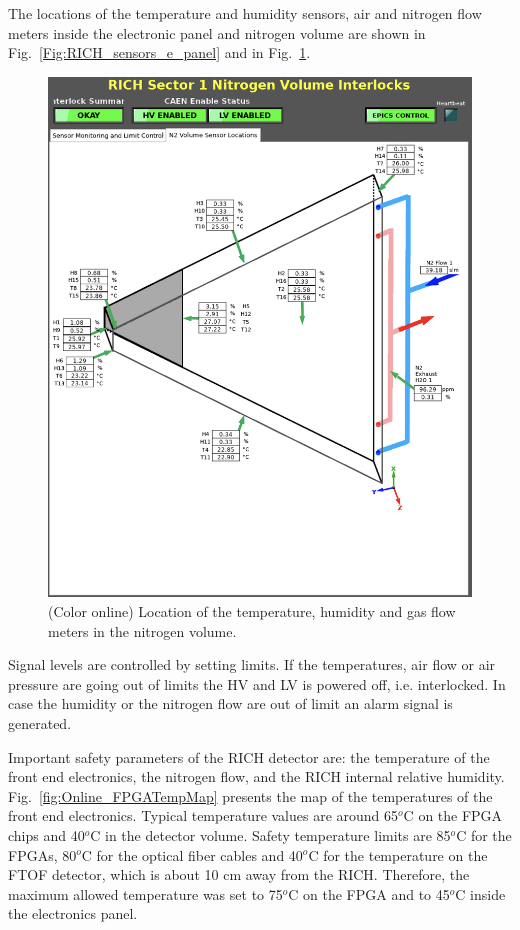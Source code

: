 \documentclass[5p,times,twocolumn]{elsarticle}
\begin{document}
The locations of the temperature and humidity sensors, air  and nitrogen flow meters inside the electronic panel and nitrogen volume  are shown in 
Fig.~\ref{Fig:RICH_sensors_e_panel} and in 
Fig.~\ref{Fig:RICH_sensors_nitrogen}.

\begin{figure}
\begin{center}
\includegraphics[width=0.7\columnwidth]{RICH_sensors_nitrogen.png}
\end{center}
\caption{(Color online) Location of the temperature, humidity and gas flow meters in the nitrogen volume.}
\label{Fig:RICH_sensors_nitrogen}
\end{figure}

Signal levels are controlled by setting limits.  If the temperatures, air flow or air pressure are going out of limits the HV and LV is powered off, i.e. interlocked.
In case the humidity or the nitrogen flow are out of limit an alarm signal is generated.

Important safety parameters of the RICH detector are: the temperature of the front end electronics, the nitrogen flow, and the RICH internal relative humidity.
Fig.~\ref{fig:Online_FPGATempMap} presents the map of the temperatures of the front end electronics.
Typical temperature values are around 65$^o$C on the FPGA chips and 40$^o$C in the detector volume.
Safety temperature limits are 85$^o$C for the FPGAs, 80$^o$C for the optical fiber cables and 40$^o$C for the temperature on the FTOF detector, which is about 10 cm away from the RICH.
Therefore, the maximum allowed temperature was set to 75$^o$C on the FPGA and to 45$^o$C inside the electronics panel.
\end{document}
